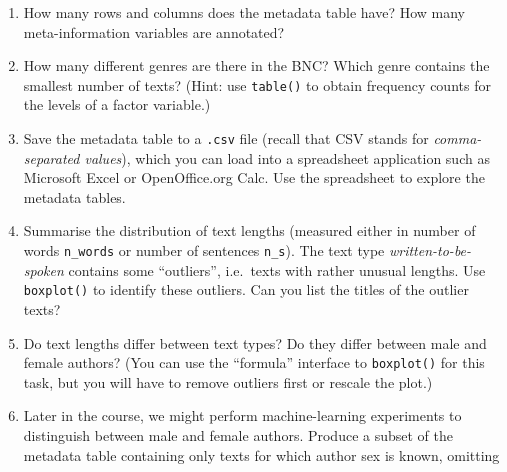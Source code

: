 \documentclass[a4paper,12pt]{article}
\begin{document}
\begin{enumerate}
\item How many rows and columns does the metadata table have?  How many
  meta-information variables are annotated?
\item How many different genres are there in the BNC?  Which genre contains
  the smallest number of texts?  (Hint: use \texttt{table()} to obtain
  frequency counts for the levels of a factor variable.)
\item Save the metadata table to a \texttt{.csv} file (recall that CSV stands
  for \emph{comma-separated values}), which you can load into a spreadsheet
  application such as Microsoft Excel or OpenOffice.org Calc.  Use the
  spreadsheet to explore the metadata tables.
\item Summarise the distribution of text lengths (measured either in number of
  words \verb|n_words| or number of sentences \verb|n_s|).  The text type
  \emph{written-to-be-spoken} contains some ``outliers'', i.e.\ texts with
  rather unusual lengths.  Use \texttt{boxplot()} to identify these outliers.  
  Can you list the titles of the outlier texts?
\item Do text lengths differ between text types?  Do they differ between male
  and female authors?  (You can use the ``formula'' interface to
  \texttt{boxplot()} for this task, but you will have to remove outliers first
  or rescale the plot.)
\item Later in the course, we might perform machine-learning experiments to
  distinguish between male and female authors.  Produce a subset of the
  metadata table containing only texts for which author sex is known, omitting

\end{enumerate}
\end{document}
